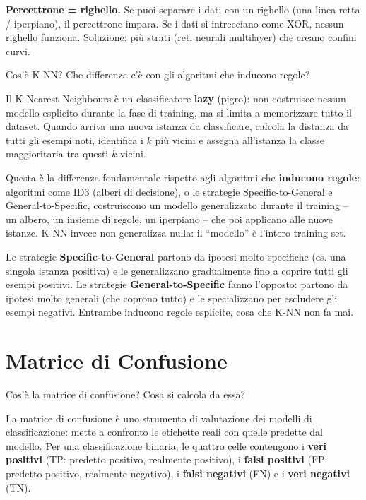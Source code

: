 \documentclass[12pt,a4paper]{article}
\begin{document}
\begin{ricordabox}
\textbf{Percettrone = righello.} Se puoi separare i dati con un righello (una linea retta / iperpiano), il percettrone impara. Se i dati si intrecciano come XOR, nessun righello funziona. Soluzione: più strati (reti neurali multilayer) che creano confini curvi.
\end{ricordabox}

\begin{domandabox}{Cos'è K-NN? Che differenza c'è con gli algoritmi che inducono regole?}
\end{domandabox}

Il K-Nearest Neighbours è un classificatore \textbf{lazy} (pigro): non costruisce nessun modello esplicito durante la fase di training, ma si limita a memorizzare tutto il dataset. Quando arriva una nuova istanza da classificare, calcola la distanza da tutti gli esempi noti, identifica i $k$ più vicini e assegna all'istanza la classe maggioritaria tra questi $k$ vicini.

Questa è la differenza fondamentale rispetto agli algoritmi che \textbf{inducono regole}: algoritmi come ID3 (alberi di decisione), o le strategie Specific-to-General e General-to-Specific, costruiscono un modello generalizzato durante il training -- un albero, un insieme di regole, un iperpiano -- che poi applicano alle nuove istanze. K-NN invece non generalizza nulla: il ``modello'' è l'intero training set.

Le strategie \textbf{Specific-to-General} partono da ipotesi molto specifiche (es. una singola istanza positiva) e le generalizzano gradualmente fino a coprire tutti gli esempi positivi. Le strategie \textbf{General-to-Specific} fanno l'opposto: partono da ipotesi molto generali (che coprono tutto) e le specializzano per escludere gli esempi negativi. Entrambe inducono regole esplicite, cosa che K-NN non fa mai.

\section{Matrice di Confusione}

\begin{domandabox}{Cos'è la matrice di confusione? Cosa si calcola da essa?}
\end{domandabox}

La matrice di confusione è uno strumento di valutazione dei modelli di classificazione: mette a confronto le etichette reali con quelle predette dal modello. Per una classificazione binaria, le quattro celle contengono i \textbf{veri positivi} (TP: predetto positivo, realmente positivo), i \textbf{falsi positivi} (FP: predetto positivo, realmente negativo), i \textbf{falsi negativi} (FN) e i \textbf{veri negativi} (TN).
\end{document}
